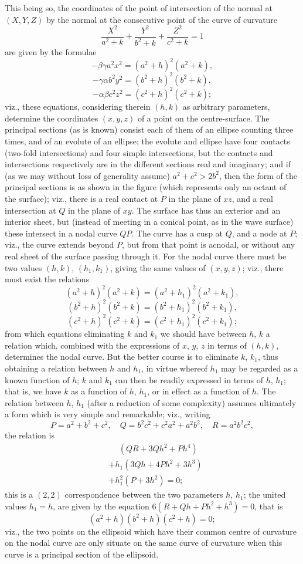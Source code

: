 \documentclass[11pt,a4paper]{article}
\begin{document}
This being so, the coordinates of the point of intersection of the normal at $(X, Y, Z)$ by
the normal at the consecutive point of the curve of curvature
\[
\frac{X^2}{a^2 + k} + \frac{Y^2}{b^2 + k} + \frac{Z^2}{c^2 + k} = 1
\]
are given by the formulae
\[
-\beta\gamma a^2 x^2 = (a^2 + h)^2 (a^2 + k),
\]
\[
-\gamma\alpha b^2 y^2 = (b^2 + h)^2 (b^2 + k),
\]
\[
-\alpha\beta c^2 z^2 = (c^2 + h)^2 (c^2 + k);
\]
viz., these equations, considering therein $(h, k)$ as arbitrary parameters, determine the
coordinates $(x, y, z)$ of a point on the centre-surface. The principal sections (as is known)
consist each of them of an ellipse counting three times, and of an evolute of an ellipse;
the evolute and ellipse have four contacts (two-fold intersections) and four simple
intersections, but the contacts and intersections respectively are in the different sections
real and imaginary; and if (as we may without loss of generality assume) $a^2 + c^2 > 2 b^2$,
then the form of the principal sections is as shown in the figure (which represents only an
octant of the surface); viz., there is a real contact at $P$ in the plane of $xz$, and a
real intersection at $Q$ in the plane of $xy$. The surface has thus an exterior and an
interior sheet, but (instead of meeting in a conical point, as in the wave surface) these
intersect in a nodal curve $QP$. The curve has a cusp at $Q$, and a node at $P$; viz., the
curve extends beyond $P$, but from that point is acnodal, or without any real sheet of the
surface passing through it. For the nodal curve there must be two values $(h, k)$,
$(h_1, k_1)$, giving the same values of $(x, y, z)$; viz., there must exist the relations
\[
(a^2 + h)^2 (a^2 + k) = (a^2 + h_1)^2 (a^2 + k_1),
\]
\[
(b^2 + h)^2 (b^2 + k) = (b^2 + h_1)^2 (b^2 + k_1),
\]
\[
(c^2 + h)^2 (c^2 + k) = (c^2 + h_1)^2 (c^2 + k_1);
\]
from which equations eliminating $k$ and $k_1$ we should have between $h$, $k$ a relation
which, combined with the expressions of $x$, $y$, $z$ in terms of $(h, k)$, determines the
nodal curve. But the better course is to eliminate $k$, $k_1$, thus obtaining a relation
between $h$ and $h_1$, in virtue whereof $h_1$ may be regarded as a known function of $h$;
$k$ and $k_1$ can then be readily expressed in terms of $h$, $h_1$; that is, we have $k$
as a function of $h$, $h_1$, or in effect as a function of $h$. The relation between $h$,
$h_1$ (after a reduction of some complexity) assumes ultimately a form which is very simple
and remarkable; viz., writing
\[
P = a^2 + b^2 + c^2,\quad Q = b^2 c^2 + c^2 a^2 + a^2 b^2,\quad R = a^2 b^2 c^2,
\]
the relation is
\[
\begin{aligned}
&\phantom{{}+{}} (Q R + 3 Q h^2 + P h^4) \\
&+ h_1 (3 Q h + 4 P h^2 + 3 h^3) \\
&+ h_1^2 (P + 3 h^2) = 0;
\end{aligned}
\]
this is a $(2, 2)$ correspondence between the two parameters $h$, $h_1$; the united values
$h_1 = h$, are given by the equation $6 (R + Q h + P h^2 + h^3) = 0$, that is
\[
(a^2 + h)(b^2 + h)(c^2 + h) = 0;
\]
viz., the two points on the ellipsoid which have their common centre of curvature on the
nodal curve are only situate on the same curve of curvature when this curve is a principal
section of the ellipsoid.
\end{document}

